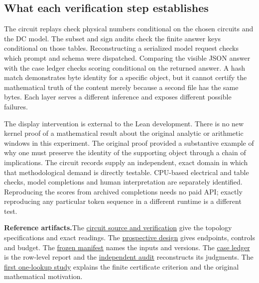 \documentclass[12pt,letterpaper]{article}
\newcommand{\reading}[2]{\par\smallskip\textsf{\color{accent}\bfseries #1}\enspace #2\par}
\begin{document}
\subsection{What each verification step establishes}

The circuit replays check physical numbers conditional on the chosen circuits and the DC model. The subset and sign audits check the finite answer keys conditional on those tables. Reconstructing a serialized model request checks which prompt and schema were dispatched. Comparing the visible JSON answer with the case ledger checks scoring conditional on the returned answer. A hash match demonstrates byte identity for a specific object, but it cannot certify the mathematical truth of the content merely because a second file has the same bytes. Each layer serves a different inference and exposes different possible failures.

The display intervention is external to the Lean development. There is no new kernel proof of a mathematical result about the original analytic or arithmetic windows in this experiment. The original proof provided a substantive example of why one must preserve the identity of the supporting object through a chain of implications. The circuit records supply an independent, exact domain in which that methodological demand is directly testable. CPU-based electrical and table checks, model completions and human interpretation are separately identified. Reproducing the scores from archived completions needs no paid API; exactly reproducing any particular token sequence in a different runtime is a different test.

\reading{Reference artifacts.}{The \href{https://github.com/nousentllc/riemann-hypothesis/tree/1d2c10d165a35b57f173f6f3e0d7d777b00ee911/research/uriel/experiments/forced-reading-audit/circuits}{circuit source and verification} give the topology specifications and exact readings. The \href{https://github.com/nousentllc/riemann-hypothesis/blob/1d2c10d165a35b57f173f6f3e0d7d777b00ee911/research/uriel/experiments/forced-reading-audit/pilot/DESIGN.md}{prospective design} gives endpoints, controls and budget. The \href{https://github.com/nousentllc/riemann-hypothesis/blob/1d2c10d165a35b57f173f6f3e0d7d777b00ee911/research/uriel/experiments/forced-reading-audit/pilot/freeze.json}{frozen manifest} names the inputs and versions. The \href{https://github.com/nousentllc/riemann-hypothesis/blob/experiments/uriel-forced-reading-audit/research/uriel/experiments/forced-reading-audit/pilot/results/cases.csv}{case ledger} is the row-level report and the \href{https://github.com/nousentllc/riemann-hypothesis/tree/experiments/uriel-forced-reading-audit/research/uriel/experiments/forced-reading-audit/audit}{independent audit} reconstructs its judgments. The \href{https://github.com/nousentllc/riemann-hypothesis/tree/42b3ce4890b5c6a584af26d34bbc54f177517871/research/uriel/experiments/binary-proof-audit-transfer}{first one-lookup study} explains the finite certificate criterion and the original mathematical motivation.}
\end{document}
